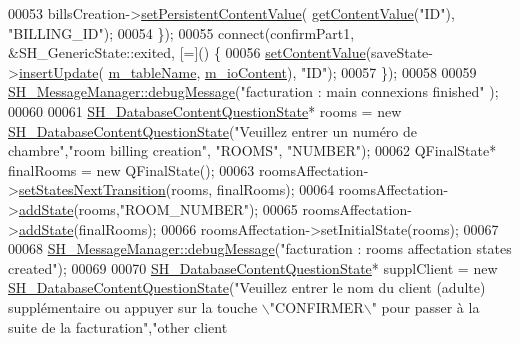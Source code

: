 \begin{DoxyCode}
00053         billsCreation->\hyperlink{classSH__LoopingInOutStateMachine_a99686121d80e3de4c64bebb1d5890ac0}{setPersistentContentValue}(
      \hyperlink{classSH__InOutStateMachine_aa1a3bd3c0ea8a59b9bc916dc718eb9ca}{getContentValue}(\textcolor{stringliteral}{"ID"}), \textcolor{stringliteral}{"BILLING\_ID"});
00054     \});
00055     connect(confirmPart1, &SH\_GenericState::exited, [=]() \{
00056         \hyperlink{classSH__InOutStateMachine_a9ab1534306b2bdb62743d4bcefe40c17}{setContentValue}(saveState->\hyperlink{classSH__AdaptDatabaseState_a037db544ea05f42d21fcbdda758839fe}{insertUpdate}(
      \hyperlink{classSH__InOutStateMachine_aa009eecc5ab6181358faafb5996b6006}{m\_tableName}, \hyperlink{classSH__InOutStateMachine_a8cfbc27eef057bf37b7711bdfef2077e}{m\_ioContent}), \textcolor{stringliteral}{"ID"});
00057     \});
00058 
00059     \hyperlink{classSH__MessageManager_a379f2aa0a590a5add34dbe91f98b2ff7}{SH\_MessageManager::debugMessage}(\textcolor{stringliteral}{"facturation : main connexions finished"}
      );
00060 
00061     \hyperlink{classSH__DatabaseContentQuestionState}{SH\_DatabaseContentQuestionState}* rooms = \textcolor{keyword}{new} 
      \hyperlink{classSH__DatabaseContentQuestionState}{SH\_DatabaseContentQuestionState}(\textcolor{stringliteral}{"Veuillez entrer un numéro de chambre"},\textcolor{stringliteral}{"room
       billing creation"}, \textcolor{stringliteral}{"ROOMS"}, \textcolor{stringliteral}{"NUMBER"});
00062     QFinalState* finalRooms = \textcolor{keyword}{new} QFinalState();
00063     roomsAffectation->\hyperlink{classSH__LoopingInOutStateMachine_a0ee122553641721012f3710e71cce234}{setStatesNextTransition}(rooms, finalRooms);
00064     roomsAffectation->\hyperlink{classSH__InOutStateMachine_a3de9dedcdfd6efab868484c047638f71}{addState}(rooms,\textcolor{stringliteral}{"ROOM\_NUMBER"});
00065     roomsAffectation->\hyperlink{classSH__InOutStateMachine_a3de9dedcdfd6efab868484c047638f71}{addState}(finalRooms);
00066     roomsAffectation->setInitialState(rooms);
00067 
00068     \hyperlink{classSH__MessageManager_a379f2aa0a590a5add34dbe91f98b2ff7}{SH\_MessageManager::debugMessage}(\textcolor{stringliteral}{"facturation : rooms affectation states
       created"});
00069 
00070     \hyperlink{classSH__DatabaseContentQuestionState}{SH\_DatabaseContentQuestionState}* supplClient = \textcolor{keyword}{new} 
      \hyperlink{classSH__DatabaseContentQuestionState}{SH\_DatabaseContentQuestionState}(\textcolor{stringliteral}{"Veuillez entrer le nom du client (adulte)
       supplémentaire ou appuyer sur la touche \(\backslash\)"CONFIRMER\(\backslash\)" pour passer à la suite de la facturation"},\textcolor{stringliteral}{"other client
}
\end{DoxyCode}
